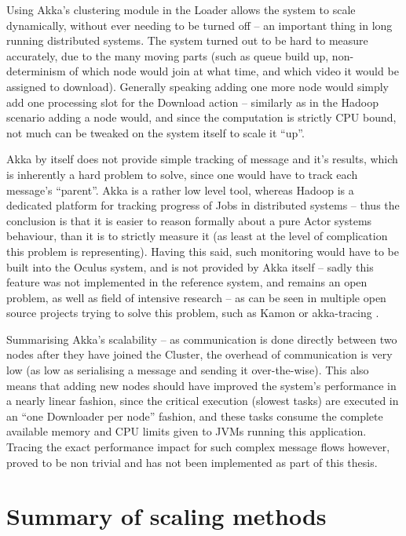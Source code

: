 Using Akka's clustering module in the Loader allows the system to scale dynamically, without ever needing to be turned off -- an important thing in long running distributed systems. The system turned out to be hard to measure accurately, due to the many moving parts (such as queue build up, non-determinism of which node would join at what time, and which video it would be assigned to download). Generally speaking adding one more node would simply add one processing slot for the Download action -- similarly as in the Hadoop scenario adding a node would, and since the computation is strictly CPU bound, not much can be tweaked on the system itself to scale it ``up''.

Akka by itself does not provide simple tracking of message and it's results, which is inherently a hard problem to solve, since one would have to track each message's ``parent''. Akka is a rather low level tool, whereas Hadoop is a dedicated platform for tracking progress of Jobs in distributed systems -- thus the conclusion is that it is easier to reason formally about a pure Actor systems behaviour, than it is to strictly measure it (as least at the level of complication this problem is representing). Having this said, such monitoring would have to be built into the Oculus system, and is not provided by Akka itself -- sadly this feature was not implemented in the reference system, and remains an open problem, as well as field of intensive research -- as can be seen in multiple open source projects trying to solve this problem, such as Kamon \cite{kamon} or akka-tracing \cite{akka-tracing}.

Summarising Akka's scalability -- as communication is done directly between two nodes after they have joined the Cluster, the overhead of communication is very low (as low as serialising a message and sending it over-the-wise). This also means that adding new nodes should have improved the system's performance in a nearly linear fashion, since the critical execution (slowest tasks) are executed in an ``one Downloader per node'' fashion, and these tasks consume the complete available memory and CPU limits given to JVMs running this application. Tracing the exact performance impact for such complex message flows however, proved to be non trivial and has not been implemented as part of this thesis.



\section{Summary of scaling methods}
\label{sec:scaling-summary}

